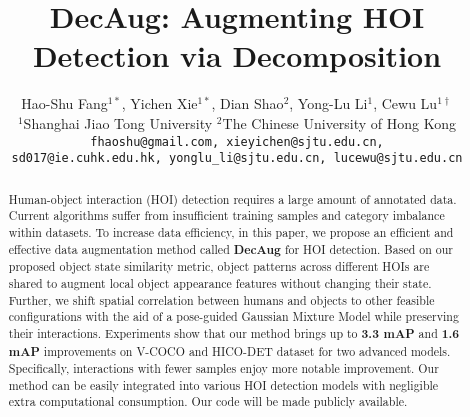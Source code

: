 \documentclass[10pt,twocolumn,letterpaper]{article}
\begin{document}
\title{\textbf{DecAug: Augmenting HOI Detection via Decomposition}}

\author{Hao-Shu Fang$^{1*}$, Yichen Xie$^{1*}$, Dian Shao$^2$, Yong-Lu Li$^{1}$, Cewu Lu$^{1\dagger}$\\
$^1$Shanghai Jiao Tong University \quad
$^2$The Chinese University of Hong Kong\\
{\tt\small fhaoshu@gmail.com, xieyichen@sjtu.edu.cn,} \\
{\tt\small sd017@ie.cuhk.edu.hk, yonglu\_li@sjtu.edu.cn, lucewu@sjtu.edu.cn}
}

\date{}
\maketitle
\let\thefootnote\relax{}
\let\thefootnote\relax{}

\begin{abstract}
Human-object interaction (HOI) detection requires a large amount of annotated data. Current algorithms suffer from insufficient training samples and category imbalance within datasets. To increase data efficiency, in this paper, we propose an efficient and effective data augmentation method called \textbf{DecAug} for HOI detection. Based on our proposed object state similarity metric, object patterns across different HOIs are shared to augment local object appearance features without changing their state. Further, we shift spatial correlation between humans and objects to other feasible configurations with the aid of a pose-guided Gaussian Mixture Model while preserving their interactions. Experiments show that our method brings up to \textbf{3.3 mAP} and \textbf{1.6 mAP} improvements on V-COCO and HICO-DET dataset for two advanced models. Specifically, interactions with fewer samples enjoy more notable improvement. Our method can be easily integrated into various HOI detection models with negligible extra computational consumption. Our code will be made publicly available.
\end{abstract}
\end{document}
